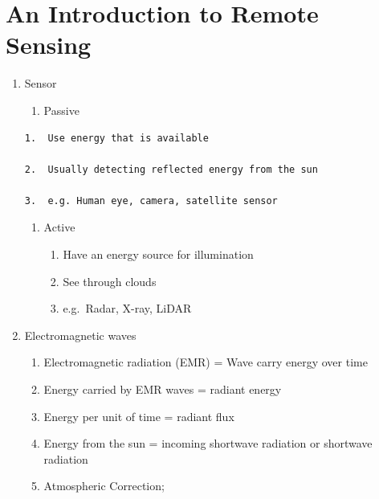 \documentclass[
  letterpaper,
  DIV=11,
  numbers=noendperiod]{scrreprt}
\providecommand{\tightlist}{%
  \setlength{\itemsep}{0pt}\setlength{\parskip}{0pt}}\usepackage{longtable,booktabs,array}
\begin{document}

\hypertarget{an-introduction-to-remote-sensing}{%
\chapter{An Introduction to Remote
Sensing}\label{an-introduction-to-remote-sensing}}

\begin{enumerate}
\def\labelenumi{\arabic{enumi}.}
\item
  Sensor

  \begin{enumerate}
  \def\labelenumii{\arabic{enumii}.}
  \tightlist
  \item
    Passive
  \end{enumerate}

\begin{verbatim}
1.  Use energy that is available

2.  Usually detecting reflected energy from the sun

3.  e.g. Human eye, camera, satellite sensor
\end{verbatim}

  \begin{enumerate}
  \def\labelenumii{\arabic{enumii}.}
  \setcounter{enumii}{1}
  \item
    Active

    \begin{enumerate}
    \def\labelenumiii{\arabic{enumiii}.}
    \item
      Have an energy source for illumination
    \item
      See through clouds
    \item
      e.g.~Radar, X-ray, LiDAR
    \end{enumerate}
  \end{enumerate}
\item
  Electromagnetic waves

  \begin{enumerate}
  \def\labelenumii{\arabic{enumii}.}
  \item
    Electromagnetic radiation (EMR) = Wave carry energy over time
  \item
    Energy carried by EMR waves = radiant energy
  \item
    Energy per unit of time = radiant flux
  \item
    Energy from the sun = incoming shortwave radiation or shortwave
    radiation
  \item
    Atmospheric Correction;


\end{enumerate}
\end{enumerate}
\end{document}
